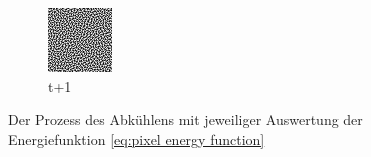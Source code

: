 \begin{figure}[H]
\begin{subfigure}[b]{0.2\linewidth}
        \includegraphics[width=\linewidth]{content/simulatedAnnealing/Bilder/next_dither_LDR_RGBA_0_64_r_channel.png}
        \caption{ t+1}
        \label{pic:dither1}
    \end{subfigure}
    \caption{Der Prozess des Abkühlens mit jeweiliger Auswertung der Energiefunktion \ref{eq:pixel energy function}}
    \label{fig:annelaing animated}
    
  \end{figure}

